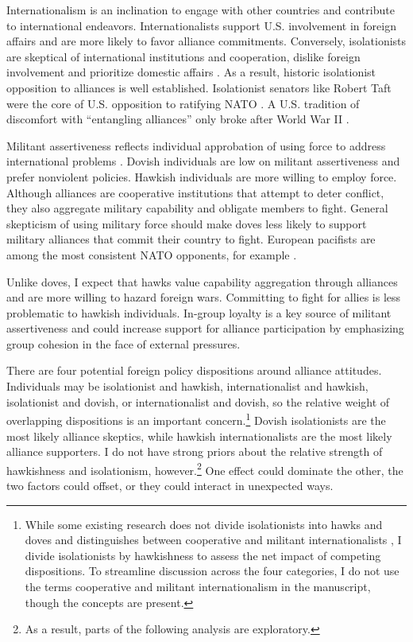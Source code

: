 \documentclass[12pt]{article}
\begin{document}
Internationalism is an inclination to engage with other countries and contribute to international endeavors. 
Internationalists support U.S. involvement in foreign affairs and are more likely to favor alliance commitments. 
Conversely, isolationists are skeptical of international institutions and cooperation, dislike foreign involvement and prioritize domestic affairs \citep{Kertzer2013}. 
As a result, historic isolationist opposition to alliances is well established. 
Isolationist senators like Robert Taft were the core of U.S. opposition to ratifying NATO \citep{Kaplan2007}.
A U.S. tradition of discomfort with ``entangling alliances'' only broke after World War II \citep{Kupchan2020}.


Militant assertiveness reflects individual approbation of using force to address international problems \citep{Herrmannetal1999}. 
Dovish individuals are low on militant assertiveness and prefer nonviolent policies.
Hawkish individuals are more willing to employ force.
Although alliances are cooperative institutions that attempt to deter conflict, they also aggregate military capability and obligate members to fight.
General skepticism of using military force should make doves less likely to support military alliances that commit their country to fight.  
European pacifists are among the most consistent NATO opponents, for example \citep{Thies2015}.


Unlike doves, I expect that hawks value capability aggregation through alliances and are more willing to hazard foreign wars. 
Committing to fight for allies is less problematic to hawkish individuals. 
In-group loyalty is a key source of militant assertiveness \citep{Kertzeretal2014} and could increase support for alliance participation by emphasizing group cohesion in the face of external pressures.


There are four potential foreign policy dispositions around alliance attitudes.
Individuals may be isolationist and hawkish, internationalist and hawkish, isolationist and dovish, or internationalist and dovish, so the relative weight of overlapping dispositions is an important concern.\footnote{While some existing research does not divide isolationists into hawks and doves and distinguishes between cooperative and militant internationalists \citep{Kertzeretal2014}, I divide isolationists by hawkishness to assess the net impact of competing dispositions. To streamline discussion across the four categories, I do not use the terms cooperative and militant internationalism in the manuscript, though the concepts are present.}
Dovish isolationists are the most likely alliance skeptics, while hawkish internationalists are the most likely alliance supporters. 
I do not have strong priors about the relative strength of hawkishness and isolationism, however.\footnote{As a result, parts of the following analysis are exploratory.}
One effect could dominate the other, the two factors could offset, or they could interact in unexpected ways.
\end{document}
